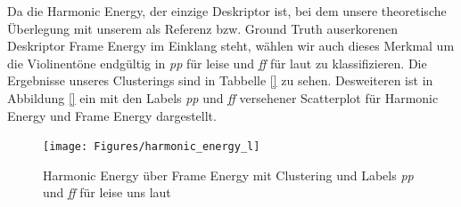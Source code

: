 Da die Harmonic Energy, der einzige Deskriptor ist, bei dem unsere theoretische Überlegung mit unserem als Referenz bzw. Ground Truth auserkorenen Deskriptor Frame Energy im Einklang steht, wählen wir auch dieses Merkmal um die Violinentöne endgültig in \textit{pp} für leise und \textit{ff} für laut zu klassifizieren. 
Die Ergebnisse unseres Clusterings sind in Tabbelle \ref{} zu sehen.
Desweiteren ist in Abbildung \ref{} ein mit den Labels \textit{pp} und \textit{ff} versehener Scatterplot für Harmonic Energy und Frame Energy dargestellt.

\begin{figure}[H]
    \center
    \texttt{[image: Figures/harmonic\_energy\_l]}
    \caption{Harmonic Energy über Frame Energy mit Clustering und Labels \textit{pp} und \textit{ff} für leise uns laut}
    \label{fig:harmonic_energy_l}
\end{figure}
